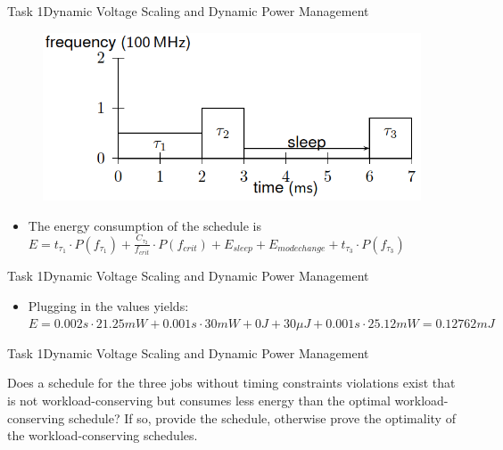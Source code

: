 \begin{frame}{Task 1}{Dynamic Voltage Scaling and Dynamic Power Management}
    \begin{solutionnoinc}
        \begin{figure}
            \centering
            \includegraphics[scale = 0.5]{figures/scheduleE).PNG}
        \end{figure}
        \begin{itemize}
            \item The energy consumption of the schedule is $E = t_{\tau_1} \cdot P(f_{\tau_1}) + \frac{C_{\tau_2}}{f_{crit}} \cdot P(f_{crit}) + E_{sleep} + E_{modechange} + t_{\tau_3} \cdot P(f_{\tau_3})$
        \end{itemize}
    \end{solutionnoinc}
\end{frame}
\begin{frame}{Task 1}{Dynamic Voltage Scaling and Dynamic Power Management}
    \begin{solution}
        \begin{itemize}
            \item Plugging in the values yields: $E = 0.002s \cdot 21.25mW + 0.001s \cdot 30mW + 0J + 30\mu J + 0.001s \cdot 25.12mW = 0.12762 mJ$
        \end{itemize}
    \end{solution}
\end{frame}
\begin{frame}{Task 1}{Dynamic Voltage Scaling and Dynamic Power Management}
    \begin{tasknoinc}
    Does a schedule for the three jobs without timing constraints violations exist that is not workload-conserving but consumes less energy than the optimal workload-conserving schedule? If so, provide the schedule, otherwise prove the optimality of the workload-conserving schedules.
    \end{tasknoinc}
\end{frame}
